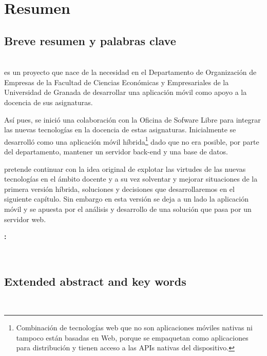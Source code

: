 \chapter{Resumen}

\section{Breve resumen y palabras clave}
\\


\bigskip
{\titulo} es un proyecto que nace de la necesidad en el Departamento de Organización de Empresas de la Facultad de Ciencias Económicas y Empresariales de la Universidad de Granada de desarrollar una aplicación móvil como apoyo a la docencia de sus asignaturas.

\bigskip
Así pues, se inició una colaboración con la Oficina de Sofware Libre para integrar las nuevas tecnologías en la docencia de estas asignaturas. Inicialmente se desarrolló como una aplicación móvil híbrida\footnote{Combinación de tecnologías web que no son aplicaciones móviles nativas ni tampoco están basadas en Web, porque se empaquetan como aplicaciones para distribución y tienen acceso a las APIs nativas del dispositivo.} dado que no era posible, por parte del departamento, mantener un servidor back-end y una base de datos.

\bigskip
{\titulo} pretende continuar con la idea original de explotar las virtudes de las nuevas tecnologías en el ámbito docente y a su vez solventar y mejorar situaciones de la primera versión híbrida, soluciones y decisiones que desarrollaremos en el siguiente capítulo. Sin embargo en esta versión se deja a un lado la aplicación móvil y se apuesta por el análisis y desarrollo de una solución  que pasa por un servidor web.

\bigskip

\bigskip




\newpage
\begin{center}
{\LARGE\bfseries\tituloEng: }{\LARGE\bfseries\subtitulo}\\
\end{center}
\begin{center}
\autor\
\end{center}

\section{Extended abstract and key words}

\\
